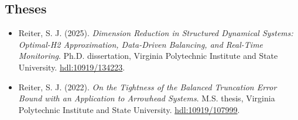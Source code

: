 \documentclass[10pt,a4paper,sans]{moderncv}        %
\begin{document}

\vspace{5pt}
\subsection{Theses}
\vspace{5pt}
\begin{itemize}
    \item Reiter, S. J. (2025). \textit{Dimension Reduction in Structured Dynamical Systems: Optimal-H2 Approximation, Data-Driven Balancing, and Real-Time Monitoring}. Ph.D. dissertation, Virginia Polytechnic Institute and State University. \url{hdl:10919/134223}. %

    \item Reiter, S. J. (2022). \textit{On the Tightness of the Balanced Truncation Error Bound with an Application to Arrowhead Systems}. M.S. thesis, Virginia Polytechnic Institute and State University. \url{hdl:10919/107999}. %
\end{itemize}
\end{document}
